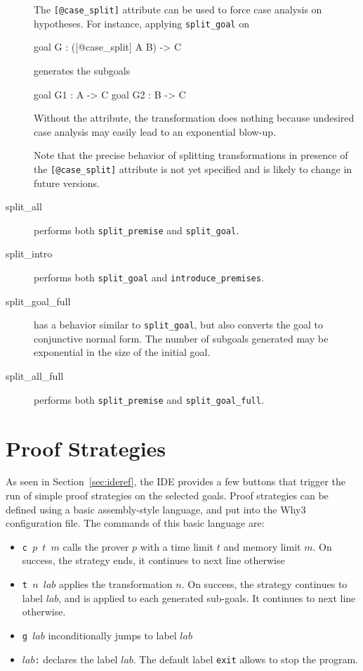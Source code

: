 \begin{description}
The \verb|[@case_split]| attribute can be used to force case analysis on hypotheses.
For instance, applying \texttt{split\_goal} on
\begin{whycode}
goal G : ([@case_split] A \/ B) -> C
\end{whycode}
generates the subgoals
\begin{whycode}
goal G1 : A -> C
goal G2 : B -> C
\end{whycode}
Without the attribute, the transformation does nothing because undesired case analysis
may easily lead to an exponential blow-up.

Note that the precise behavior of splitting transformations in presence of
the \verb|[@case_split]| attribute is not yet specified
and is likely to change in future versions.


\item[split\_all]
  performs both \texttt{split\_premise} and \texttt{split\_goal}.

\item[split\_intro]
  performs both \texttt{split\_goal} and \texttt{introduce\_premises}.

\item[split\_goal\_full]
  has a behavior similar
  to \texttt{split\_goal}, but also converts the goal to conjunctive normal form.
  The number of subgoals generated may be exponential in the size of the initial goal.

\item[split\_all\_full]
  performs both \texttt{split\_premise} and \texttt{split\_goal\_full}.


\end{description}


\section{Proof Strategies}
\label{sec:strategies}

As seen in Section~\ref{sec:ideref}, the IDE provides a few buttons
that trigger the run of simple proof strategies on the selected goals.
Proof strategies can be defined using a basic assembly-style language,
and put into the Why3 configuration file. The commands of this basic
language are:
\begin{itemize}
\item \texttt{c $p$ $t$ $m$} calls the prover $p$ with a time limit
  $t$ and memory limit $m$. On success, the strategy ends, it
  continues to next line otherwise
\item \texttt{t $n$ $lab$} applies the transformation $n$. On success,
  the strategy continues to label $lab$, and is applied to each
  generated sub-goals.  It continues to next line otherwise.
\item \texttt{g $lab$} inconditionally jumps to label $lab$
\item \texttt{$lab$:} declares the label $lab$. The default label
  \texttt{exit} allows to stop the program.
\end{itemize}

